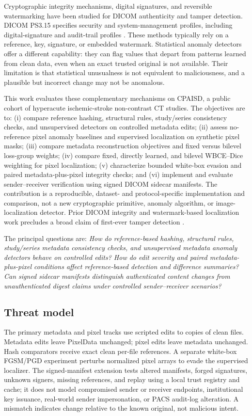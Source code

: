 \documentclass[journal]{IEEEtran}
\begin{document}
  Cryptographic integrity mechanisms, digital signatures, and reversible watermarking have been studied for DICOM authenticity and tamper detection. DICOM PS3.15 specifies security and system-management profiles, including digital-signature and audit-trail profiles \cite{dicomps315}. These methods typically rely on a reference, key, signature, or embedded watermark. Statistical anomaly detectors offer a different capability: they can flag values that depart from patterns learned from clean data, even when an exact trusted original is not available. Their limitation is that statistical unusualness is not equivalent to maliciousness, and a plausible but incorrect change may not be anomalous.
  
  This work evaluates these complementary mechanisms on CPAISD, a public cohort of hyperacute ischemic-stroke non-contrast CT studies. The objectives are to: (i) compare reference hashing, structural rules, study/series consistency checks, and unsupervised detectors on controlled metadata edits; (ii) assess no-reference pixel anomaly baselines and supervised localization on synthetic pixel masks; (iii) compare metadata reconstruction objectives and fixed versus bilevel loss-group weights; (iv) compare fixed, directly learned, and bilevel WBCE--Dice weighting for pixel localization; (v) characterize bounded white-box evasion and paired metadata-plus-pixel integrity checks; and (vi) implement and evaluate sender--receiver verification using signed DICOM sidecar manifests. The contribution is a reproducible, dataset- and protocol-specific implementation and comparison, not a new cryptographic primitive, anomaly algorithm, or image-localization detector. Prior DICOM integrity and watermark-based localization work precludes a broad claim of first-ever tamper detection \cite{kobayashi2009,tan2011,dou2012,alhaj2015,oh2026}.
  
  The principal questions are: \emph{How do reference-based hashing, structural rules, study/series metadata consistency checks, and unsupervised metadata anomaly detectors behave on controlled edits? How do edit severity and paired metadata-plus-pixel conditions affect reference-based detection and difference summaries? Can signed sidecar manifests distinguish authenticated content changes from unauthenticated digest claims under controlled sender--receiver scenarios?}
  
  \subsection{Threat model}
  The primary metadata and pixel tracks use scripted edits to copies of clean files. Metadata edits leave PixelData unchanged; pixel edits leave metadata unchanged. Hash comparators receive exact clean per-file references. A separate white-box FGSM/PGD experiment perturbs normalized pixel arrays to evade the supervised localizer. The signed-manifest extension tests altered manifests, forged signatures, unknown signers, missing references, and replay using a local trust registry and cache; it does not model compromised sender or receiver endpoints, institutional key issuance, real-world sender impersonation, or PACS audit-log alteration. A mismatch indicates change relative to the known original, not malicious intent.
  
\end{document}

